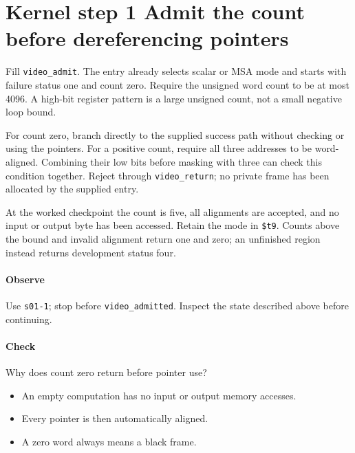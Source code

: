 \section{Kernel step 1 Admit the count before dereferencing pointers}
Fill \texttt{video\_admit}. The entry already selects scalar or MSA mode and starts with failure status one and count zero. Require the unsigned word count to be at most 4096. A high-bit register pattern is a large unsigned count, not a small negative loop bound.

For count zero, branch directly to the supplied success path without checking or using the pointers. For a positive count, require all three addresses to be word-aligned. Combining their low bits before masking with three can check this condition together. Reject through \texttt{video\_return}; no private frame has been allocated by the supplied entry.

At the worked checkpoint the count is five, all alignments are accepted, and no input or output byte has been accessed. Retain the mode in \texttt{\$t9}. Counts above the bound and invalid alignment return one and zero; an unfinished region instead returns development status four.

\paragraph{Observe} Use \texttt{s01-1}; stop before \texttt{video\_admitted}. Inspect the state described above before continuing.

\paragraph{Check} Why does count zero return before pointer use?
\begin{itemize}
  \item[A.] An empty computation has no input or output memory accesses.
  \item[B.] Every pointer is then automatically aligned.
  \item[C.] A zero word always means a black frame.
\end{itemize}
